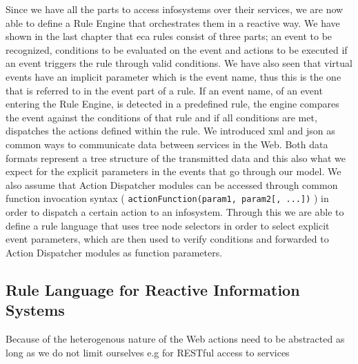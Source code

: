 Since we have all the parts to access \textrm{\glspl{infosystem}} over their services, we are now able to define a \textrm{Rule Engine} that orchestrates them in a reactive way.
We have shown in the last chapter that \textrm{\acrshort{eca}} rules consist of three parts; an event to be recognized, conditions to be evaluated on the event and actions to be executed if an event triggers the rule through valid conditions.
We have also seen that virtual events have an implicit parameter which is the event name, thus this is the one that is referred to in the event part of a rule.
If an event name, of an event entering the \textrm{Rule Engine}, is detected in a predefined rule, the engine compares the event against the conditions of that rule and if all conditions are met, dispatches the actions defined within the rule.
We introduced \textrm{\acrshort{xml}} and \textrm{\acrshort{json}} as common ways to communicate data between services in the Web.
Both data formats represent a tree structure of the transmitted data and this also what we expect for the explicit parameters in the events that go through our model.
We also assume that \textrm{Action Dispatcher} modules can be accessed through common function invocation syntax ( \texttt{actionFunction(param1, param2[, ...])} ) in order to dispatch a certain action to an \textrm{\gls{infosystem}}.
Through this we are able to define a rule language that uses tree node selectors in order to select explicit event parameters, which are then used to verify conditions and forwarded to \textrm{Action Dispatcher} modules as function parameters.

\subsection{Rule Language for Reactive Information Systems}








Because of the heterogenous nature of the Web actions need to be abstracted
as long as we do not limit ourselves e.g for RESTful access to services



